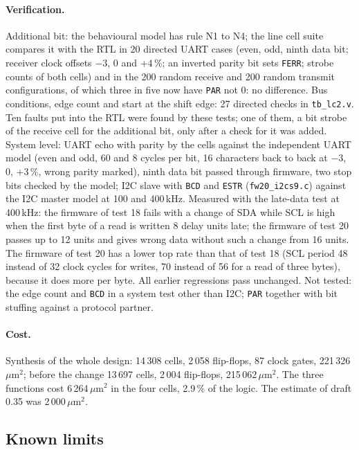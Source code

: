 \documentclass[10pt,a4paper]{article}
\newcommand{\reg}[1]{\texttt{#1}}
\begin{document}
\paragraph{Verification.} Additional bit: the behavioural model has rule N1 to N4; the line cell suite compares
it with the RTL in 20 directed UART cases (even, odd, ninth data bit; receiver clock offsets $-3$, 0 and
$+4\,\%$; an inverted parity bit sets \reg{FERR}; strobe counts of both cells) and in the 200 random receive and 200 random
transmit configurations, of which three in five now have \reg{PAR} not 0: no difference. Bus conditions, edge
count and start at the shift edge: 27 directed checks in \texttt{tb\_lc2.v}. Ten faults put into the RTL
were found by these tests; one of them, a bit strobe of the receive cell for the additional bit, only after a check for it was added. System level: UART echo with parity by the cells against the independent UART
model (even and odd, 60 and 8 cycles per bit, 16 characters back to back at $-3$, 0, $+3\,\%$, wrong parity
marked), ninth data bit passed through firmware, two stop bits checked by the model; I2C slave with \reg{BCD}
and \reg{ESTR} (\texttt{fw20\_i2cs9.c}) against the I2C master model at 100 and 400\,kHz. Measured with
the late-data test at 400\,kHz: the firmware of test 18 fails with a change of SDA while SCL is high when the
first byte of a read is written 8 delay units late; the firmware of test 20 passes up to 12 units and gives
wrong data without such a change from 16 units. The firmware of test 20 has a lower top rate than that of
test 18 (SCL period 48 instead of 32 clock cycles for writes, 70 instead of 56 for a read of three bytes),
because it does more per byte. All earlier regressions pass unchanged. Not tested: the edge count and
\reg{BCD} in a system test other than I2C; \reg{PAR} together with bit stuffing against a protocol partner.

\paragraph{Cost.} Synthesis of the whole design: 14\,308 cells, 2\,058 flip-flops, 87 clock gates,
221\,326\,$\mu$m$^2$; before the change 13\,697 cells, 2\,004 flip-flops, 215\,062\,$\mu$m$^2$. The three functions
cost 6\,264\,$\mu$m$^2$ in the four cells, 2.9\,\% of the logic. The estimate of draft 0.35 was 2\,000\,$\mu$m$^2$.

\subsection{Known limits}\label{sec:lclimits}
\end{document}
